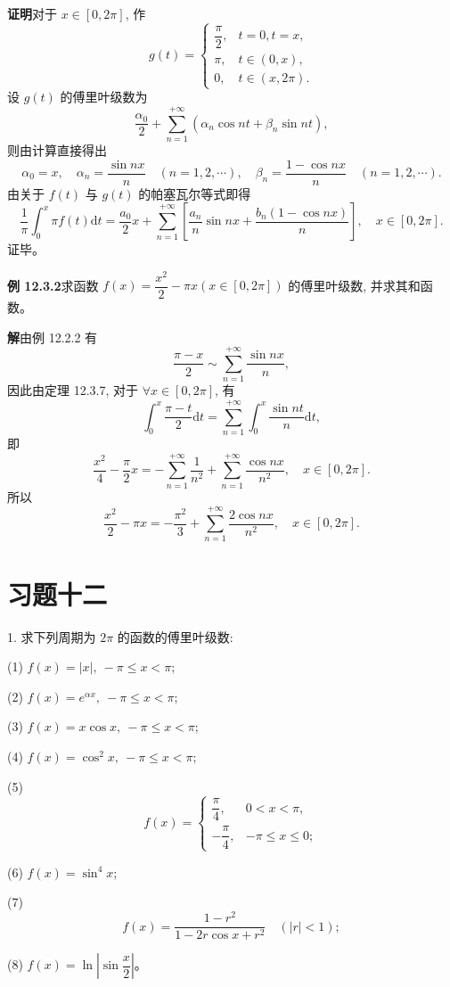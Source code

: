 \documentclass[UTF8, 12pt, fontset=fandol, oneside]{ctexart}
\begin{document}
\noindent\textbf{证明}\quad 对于 $x\in[0,2\pi]$, 作
\[
  g(t)=
  \begin{cases}
    \dfrac{\pi}{2}, & t=0,t=x,\\
    \pi, & t\in(0,x),\\
    0, & t\in(x,2\pi).
  \end{cases}
\]
设 $g(t)$ 的傅里叶级数为
\[
  \frac{\alpha_0}{2}+\sum_{n=1}^{+\infty}(\alpha_n\cos nt+\beta_n\sin nt),
\]
则由计算直接得出
\[
  \alpha_0=x,\quad
  \alpha_n=\frac{\sin nx}{n}\quad(n=1,2,\cdots),\quad
  \beta_n=\frac{1-\cos nx}{n}\quad(n=1,2,\cdots).
\]
由关于 $f(t)$ 与 $g(t)$ 的帕塞瓦尔等式即得
\[
  \frac1\pi\int_0^x\pi f(t)\mathrm dt
  =
  \frac{a_0}{2}x
  +\sum_{n=1}^{+\infty}
  \left[
    \frac{a_n}{n}\sin nx+\frac{b_n(1-\cos nx)}{n}
  \right],
  \quad x\in[0,2\pi].
\]
证毕。

\noindent\textbf{例 12.3.2}\quad 求函数 $f(x)=\dfrac{x^2}{2}-\pi x(x\in[0,2\pi])$ 的傅里叶级数, 并求其和函数。

\noindent\textbf{解}\quad 由例 12.2.2 有
\[
  \frac{\pi-x}{2}\sim\sum_{n=1}^{+\infty}\frac{\sin nx}{n},
\]
因此由定理 12.3.7, 对于 $\forall x\in[0,2\pi]$, 有
\[
  \int_0^x\frac{\pi-t}{2}\mathrm dt
  =
  \sum_{n=1}^{+\infty}\int_0^x\frac{\sin nt}{n}\mathrm dt,
\]
即
\[
  \frac{x^2}{4}-\frac{\pi}{2}x
  =
  -\sum_{n=1}^{+\infty}\frac1{n^2}
  +\sum_{n=1}^{+\infty}\frac{\cos nx}{n^2},\quad x\in[0,2\pi].
\]
所以
\[
  \frac{x^2}{2}-\pi x
  =
  -\frac{\pi^2}{3}+\sum_{n=1}^{+\infty}\frac{2\cos nx}{n^2},\quad x\in[0,2\pi].
\]

\section*{习题十二}

1. 求下列周期为 $2\pi$ 的函数的傅里叶级数:

(1) $f(x)=|x|,\ -\pi\leqslant x<\pi$;

(2) $f(x)=e^{\alpha x},\ -\pi\leqslant x<\pi$;

(3) $f(x)=x\cos x,\ -\pi\leqslant x<\pi$;

(4) $f(x)=\cos^2x,\ -\pi\leqslant x<\pi$;

(5)
\[
  f(x)=
  \begin{cases}
    \dfrac{\pi}{4}, & 0<x<\pi,\\
    -\dfrac{\pi}{4}, & -\pi\leqslant x\leqslant0;
  \end{cases}
\]

(6) $f(x)=\sin^4x$;

(7)
\[
  f(x)=\frac{1-r^2}{1-2r\cos x+r^2}\quad(|r|<1);
\]

(8) $f(x)=\ln\left|\sin\dfrac x2\right|$。
\end{document}
